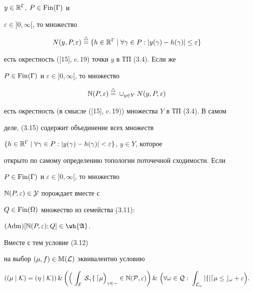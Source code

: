 $y\in\Bbb R^\Gamma,\;P \in \operatorname{Fin}(\Gamma)$ и


$\varepsilon \in ]0,\infty[$, то множество


\begin{equation}


{N(y,P,\varepsilon)}\overset{\triangle}{=}{}\{h\in\Bbb R^\Gamma


\mid\forall\gamma\in P:|y(\gamma)-h(\gamma)|\le


\varepsilon\}


\end{equation}


есть окрестность ([15], c.\,19) точки $y$ в ТП (3.4). Если же


$P\in\operatorname{Fin}(\Gamma)$ и $\varepsilon\in]0,\infty[$, то множество


\begin{equation}


\Bbb N(P,\varepsilon)\overset{\triangle}{=}{}


\cup_{y \in Y}N(y,P,\varepsilon)


\end{equation}


есть окрестность (в смысле ([15], c.\,19)) множества $Y$ в ТП (3.4). В самом


деле, (3.15) содержит объединение всех множеств


$\{h\in\Bbb R^\Gamma\mid\forall\gamma\in P:


|y(\gamma)-h(\gamma)|<\varepsilon\}$, $y\in Y$, которое


открыто по самому определению топологии поточечной сходимости. Если


$P\in\operatorname{Fin}(\Gamma)$ и $\varepsilon\in]0,\infty[$, то множество


$\Bbb N(P,\varepsilon)\in\cal Y$ порождает вместе с


$Q\in\operatorname{Fin}(\Omega)$ множество из семейства (3.11):


$(\Adm)[\Bbb N(P,\varepsilon);Q]\in\wh {\frak A}$.


Вместе с тем условие (3.12)


на выбор $(\mu,f)\in\Bbb M(\cal L)$ эквивалентно условию


\begin{equation}


((\mu\mid \cal K)=(\eta\mid\cal K))\,\&\,


\bigg(\Big(\,\int_E\;S_\gamma f\, d\mu\Big)_{\gamma\in\Gamma}\in


\Bbb N(P,\varepsilon)\bigg)\, \&\


\Big(\forall{\omega}\in Q:\;


\int_{L_\omega}|f|d\mu\le c_\omega+\varepsilon\Big).


\end{equation}


